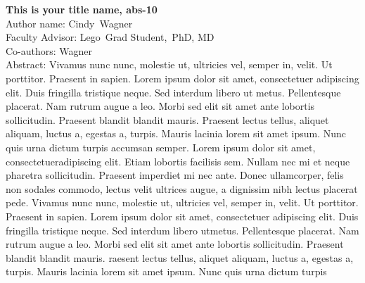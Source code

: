 \documentclass[float=false, crop=false]{standalone}
\begin{document}
\textbf{This is your title name, abs-10}\\\noindent
Author name: Cindy~Wagner \\\noindent
Faculty Advisor: Lego~Grad Student,~PhD, MD\\\noindent
Co-authors: Wagner \\\noindent
Abstract: Vivamus nunc nunc, molestie ut, ultricies vel, semper in, velit. Ut porttitor. Praesent in sapien. Lorem ipsum dolor sit amet, consectetuer adipiscing elit. Duis fringilla tristique neque. Sed interdum libero ut metus. Pellentesque placerat. Nam rutrum augue a leo. Morbi sed elit sit amet ante lobortis sollicitudin. Praesent blandit blandit mauris. Praesent lectus tellus, aliquet aliquam, luctus a, egestas a, turpis. Mauris lacinia lorem sit amet ipsum. Nunc quis urna dictum turpis accumsan semper. Lorem ipsum dolor sit amet, consectetueradipiscing elit. Etiam lobortis facilisis sem. Nullam nec mi et neque pharetra sollicitudin. Praesent imperdiet mi nec ante. Donec ullamcorper, felis non sodales commodo, lectus velit ultrices augue, a dignissim nibh lectus placerat pede. Vivamus nunc nunc, molestie ut, ultricies vel, semper in, velit. Ut porttitor. Praesent in sapien. Lorem ipsum dolor sit amet, consectetuer adipiscing elit. Duis fringilla tristique neque. Sed interdum libero utmetus. Pellentesque placerat. Nam rutrum augue a leo. Morbi sed elit sit amet ante lobortis sollicitudin. Praesent blandit blandit mauris. raesent lectus tellus, aliquet aliquam, luctus a, egestas a, turpis. Mauris lacinia lorem sit amet ipsum. Nunc quis urna dictum turpis\\\newline
\end{document}
